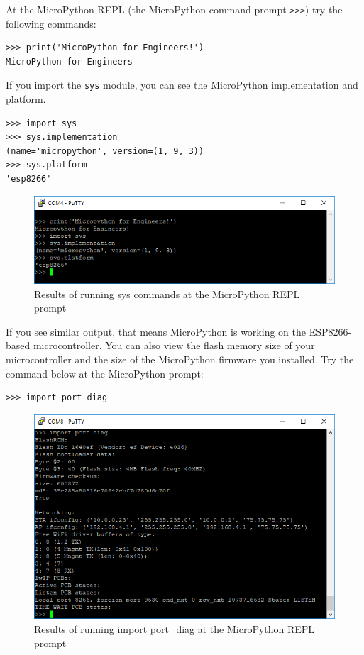 \documentclass{book}
\makeatletter
\def\maxwidth{\ifdim\Gin@nat@width>\linewidth\linewidth
    \else\Gin@nat@width\fi}
\let\Oldincludegraphics\includegraphics
\renewcommand{\includegraphics}[1]{\Oldincludegraphics[width=.8\maxwidth]{#1}}
\makeatother
\begin{document}
    
        At the MicroPython REPL (the MicroPython command prompt \lstinline!>>>!)
try the following commands:

\begin{lstlisting}
>>> print('MicroPython for Engineers!')
MicroPython for Engineers
\end{lstlisting}

If you import the \lstinline!sys! module, you can see the MicroPython
implementation and platform.

\begin{lstlisting}
>>> import sys
>>> sys.implementation
(name='micropython', version=(1, 9, 3))
>>> sys.platform
'esp8266'
\end{lstlisting}

\begin{figure}
\centering
\includegraphics{images/sys_dot_implementation_and_platform.PNG}
\caption{Results of running sys commands at the MicroPython REPL prompt}
\end{figure}

If you see similar output, that means MicroPython is working on the
ESP8266-based microcontroller. You can also view the flash memory size
of your microcontroller and the size of the MicroPython firmware you
installed. Try the command below at the MicroPython prompt:

\begin{lstlisting}
>>> import port_diag
\end{lstlisting}

\begin{figure}
\centering
\includegraphics{images/import_port_diag.PNG}
\caption{Results of running import port\_diag at the MicroPython REPL
prompt}
\end{figure}
\end{document}
